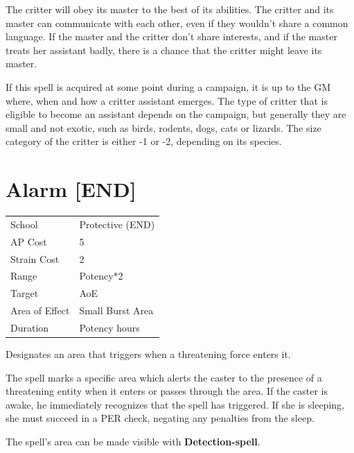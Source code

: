 \documentclass[11pt,a4paper,twocolumn]{book}
\begin{document}
The critter will obey its master to the best of its abilities. The critter and its master can communicate with each other, even if they wouldn't share a common language. If the master and the critter don't share interests, and if the master treats her assistant badly, there is a chance that the critter might leave its master.

If this spell is acquired at some point during a campaign, it is up to the GM where, when and how a critter assistant emerges. The type of critter that is eligible to become an assistant depends on the campaign, but generally they are small and not exotic, such as birds, rodents, dogs, cats or lizards. The size category of the critter is either -1 or -2, depending on its species.


\section*{Alarm [END]}
{
	\begin{tabu} to 75mm{| X[l,4] | X[l,7] |}
		\hline
		School 			& Protective (END) 	\\
        AP Cost	      	& 5 				\\
        Strain Cost     & 2 				\\
        Range     		& Potency*2 		\\
        Target      	& AoE 				\\
        Area of Effect  & Small Burst Area 	\\
        Duration     	& Potency hours 	\\ \hline
	\end{tabu}
		
}

\medskip

Designates an area that triggers when a threatening force enters it.

The spell marks a specific area which alerts the caster to the presence of a threatening entity when it enters or passes through the area. If the caster is awake, he immediately recognizes that the spell has triggered. If she is sleeping, she must succeed in a PER check, negating any penalties from the sleep.

The spell's area can be made visible with \textbf{Detection-spell}.

\vfill
\end{document}
